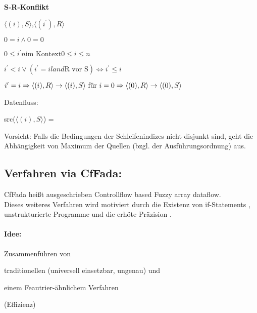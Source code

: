 \textbf{S-R-Konflikt}\\
    \begin{\itemize}
    \item $\langle (i), S \rangle \text{,} \langle(i^\prime), R \rangle$
    \item $0=i \land 0 = 0$
    \item $0 \leq i^\prime n \text{im Kontext} 0 \leq i \leq n$
    \item $i^\prime < i \lor (i^\prime = i land \text{R vor S}) \Leftrightarrow i^\prime \leq i$
    \item $i^\prime = i \\ 
        \Rightarrow \langle (i),R \rangle \rightarrow \langle (i), S \rangle \text{ für } i=0 \\
        \Rightarrow \langle (0),R \rangle \rightarrow \langle (0), S \rangle$

    \end{\itemize}
Datenfluss: \\
\begin{procedure}
    src($ \langle (i), S \rangle $) =\\ 
\end{procedure}

Vorsicht: Falls die Bedingungen der Schleifenindizes nicht disjunkt sind, geht die Abhängigkeit von Maximum der Quellen (bzgl. der Ausführungsordnung) aus.


\subsection{Verfahren via CfFada:}

CfFada heißt ausgeschrieben \glqq Controllflow based Fuzzy array dataflow\grqq.\\
Dieses weiteres Verfahren wird motiviert durch die Existenz von \glqq if-Statements \grqq , \glqq unstrukturierte Programme \grqq und die erhöte \glqq Präzision \grqq.\\
\paragraph{Idee:}
\begin{\itemize}
    \item Zusammenführen von
    \begin {\itemize}
        \item traditionellen (universell einsetzbar, ungenau) und
        \item einem Feautrier-ähnlichem Verfahren
    \end{\itemize}
    \item (Effizienz)
\end{\itemize}


